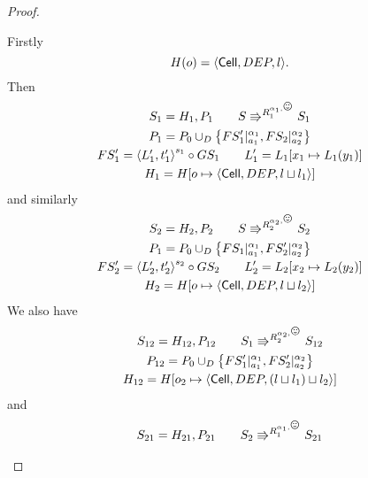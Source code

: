 \begin{proof}
\begin{description}
      Firstly
      \begin{equation}
        H(o) = \mbox{$\langle \mbox{$\mathsf{Cell}$}{}, DEP, l \rangle$}.
      \end{equation}
      Then
      \begin{equation}
        \begin{gathered}
          S_1 = H_1, P_1 \andalso S \Rrightarrow^{R_1^{\alpha_1, \smiley}} S_1
          \\
          P_1 = P_0 \cup_D \left\{ FS'_1|_{a_1}^{\alpha_1},
          FS_2|_{a_2}^{\alpha_2} \right\} \\
          FS'_1 = \xframe{L'_1, t'_1}^{s_1} \circ GS_1  \andalso L'_1 = L_1[x_1 \mapsto
          L_1(y_1)] \\
          H_1 = H[o \mapsto \Cell{DEP, l \sqcup l_1}]
        \end{gathered}
      \end{equation}
      and similarly
      \begin{equation}
        \begin{gathered}
          S_2 = H_2, P_2 \andalso S \Rrightarrow^{R_2^{\alpha_2, \smiley}} S_2
          \\
          P_1 = P_0 \cup_D \left\{ FS_1|_{a_1}^{\alpha_1},
          FS'_2|_{a_2}^{\alpha_2} \right\} \\
          FS'_2 = \xframe{L'_2, t'_2}^{s_2} \circ GS_2  \andalso L'_2 = L_2[x_2 \mapsto
          L_2(y_2)] \\
          H_2 = H[o \mapsto \Cell{DEP, l \sqcup l_2}]
        \end{gathered}
      \end{equation}
      We also have
      \begin{equation}
        \begin{gathered}
          S_{12} = H_{12}, P_{12} \andalso S_1 \Rrightarrow^{R_2^{\alpha_2,
          \smiley}} S_{12}
          \\
          P_{12} = P_0 \cup_D \left\{ FS'_1|_{a_1}^{\alpha_1},
          FS'_2|_{a_2}^{\alpha_2} \right\} \\
          H_{12} = H[o_2 \mapsto \Cell{DEP, (l \sqcup l_1) \sqcup l_2}]
        \end{gathered}
      \end{equation}
      and
      \begin{equation}
        \begin{gathered}
          S_{21} = H_{21}, P_{21} \andalso S_2 \Rrightarrow^{R_1^{\alpha_1,
          \smiley}} S_{21}
          \\

\end{gathered}
\end{equation}
\end{description}
\end{proof}
